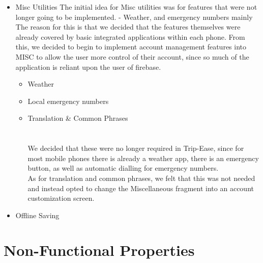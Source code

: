 \documentclass[12pt]{article}
\begin{document}
\begin{itemize}
		\item{Misc Utilities}
		The initial idea for Misc utilities was for features that were not longer going to be implemented.
		- Weather, and emergency numbers mainly
		The reason for this is that we decided that the features themselves were already covered by basic integrated applications within each phone.
		From this, we decided to begin to implement account management features into MISC to allow the user more control of their account, since so much of the
		application is reliant upon the user of firebase.



		\begin{itemize}
			\item Weather
			\item Local emergency numbers
			\item Translation \& Common Phrases
			\\
			\\
			\\
			We decided that these were no longer required in Trip-Ease, since for most mobile phones there is already a weather app, there is an emergency button, as well as automatic dialling for emergency numbers.\\
			As for translation and common phrases, we felt that this was not needed and instead opted to change the Miscellaneous fragment into an account customization screen.
		\end{itemize}

		\item{Offline Saving}

	\end{itemize}

	\section*{Non-Functional Properties}
\end{document}
